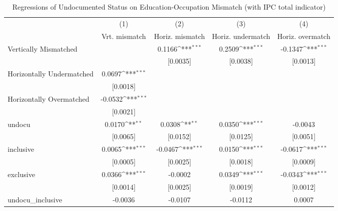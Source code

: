 \begin{table}[htbp]\centering
\def\sym#1{\ifmmode^{#1}\else\(^{#1}\)\fi}
\caption{Regressions of Undocumented Status on Education-Occupation Mismatch (with IPC total indicator)}
\begin{tabular}{l*{4}{c}}
\toprule
                    &\multicolumn{1}{c}{(1)}         &\multicolumn{1}{c}{(2)}         &\multicolumn{1}{c}{(3)}         &\multicolumn{1}{c}{(4)}         \\
                    &Vrt. mismatch         &Horiz. mismatch         &Horiz. undermatch         &Horiz. overmatch         \\
\midrule
Vertically Mismatched&                     &      0.1166\sym{***}&      0.2509\sym{***}&     -0.1347\sym{***}\\
                    &                     &    [0.0035]         &    [0.0038]         &    [0.0013]         \\
\addlinespace
Horizontally Undermatched&      0.0697\sym{***}&                     &                     &                     \\
                    &    [0.0018]         &                     &                     &                     \\
\addlinespace
Horizontally Overmatched&     -0.0532\sym{***}&                     &                     &                     \\
                    &    [0.0021]         &                     &                     &                     \\
\addlinespace
undocu              &      0.0170\sym{**} &      0.0308\sym{**} &      0.0350\sym{***}&     -0.0043         \\
                    &    [0.0065]         &    [0.0152]         &    [0.0125]         &    [0.0051]         \\
\addlinespace
inclusive           &      0.0065\sym{***}&     -0.0467\sym{***}&      0.0150\sym{***}&     -0.0617\sym{***}\\
                    &    [0.0005]         &    [0.0025]         &    [0.0018]         &    [0.0009]         \\
\addlinespace
exclusive           &      0.0366\sym{***}&     -0.0002         &      0.0349\sym{***}&     -0.0343\sym{***}\\
                    &    [0.0014]         &    [0.0025]         &    [0.0019]         &    [0.0012]         \\
\addlinespace
undocu\_inclusive    &     -0.0036         &     -0.0107         &     -0.0112         &      0.0007         \\

\end{tabular}
\end{table}

